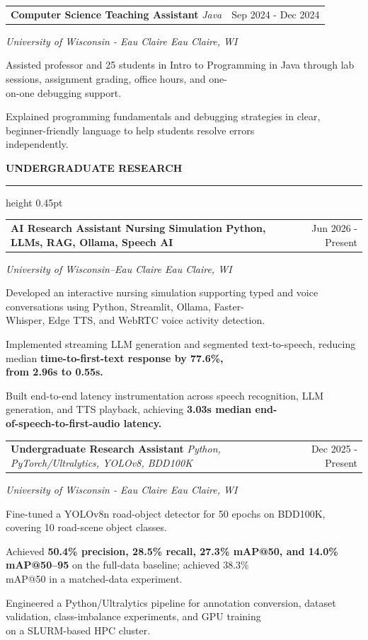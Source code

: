 \documentclass[letterpaper,10pt]{article}
\makeatletter
\newcommand{\sectionfont}{\fontsize{9.96}{10.9}\selectfont\bfseries}
\newcommand{\entryfont}{\fontsize{9.48}{10.92}\selectfont}
\newcommand{\bulletfont}{\fontsize{9.00}{10.32}\selectfont}
\newcommand{\resumesection}[1]{%
  \vspace{2.15pt}%
  {\sectionfont #1}\par
  \vspace{0.15pt}\hrule height 0.45pt\vspace{4.45pt}%
}
\newcommand{\twocolrow}[2]{%
  \noindent\begin{tabular*}{\textwidth}{@{}l@{\extracolsep{\fill}}r@{}}
    #1 & #2
  \end{tabular*}\par
}
\newcommand{\resbullet}[1]{%
  {\bulletfont\noindent\hangindent=11.52pt\hangafter=1\makebox[11.52pt][l]{\textbullet\hspace{3.4pt}}#1\par\vspace{0.95pt}}%
}
\makeatother
\begin{document}
\vspace{0.2pt}
{\entryfont
\twocolrow{\textbf{Computer Science Teaching Assistant} \textit{\textbar{} Java}}{Sep 2024 - Dec 2024}
\textit{University of Wisconsin - Eau Claire \textbar{} Eau Claire, WI}\par
}
\resbullet{Assisted professor and 25 students in Intro to Programming in Java through lab sessions, assignment grading, office hours, and one-\\
on-one debugging support.}
\resbullet{Explained programming fundamentals and debugging strategies in clear, beginner-friendly language to help students resolve errors\\
independently.}

\resumesection{UNDERGRADUATE RESEARCH}
{\entryfont
\twocolrow{\textbf{AI Research Assistant \textemdash{} Nursing Simulation \textbar{} Python, LLMs, RAG, Ollama, Speech AI}}{Jun 2026 - Present}
\textit{University of Wisconsin--Eau Claire \textbar{} Eau Claire, WI}\par
}
\resbullet{Developed an interactive nursing simulation supporting typed and voice conversations using Python, Streamlit, Ollama, Faster-\\
Whisper, Edge TTS, and WebRTC voice activity detection.}
\resbullet{Implemented streaming LLM generation and segmented text-to-speech, reducing median \textbf{time-to-first-text response by 77.6\%,}\\
\textbf{from 2.96s to 0.55s.}}
\resbullet{Built end-to-end latency instrumentation across speech recognition, LLM generation, and TTS playback, achieving \textbf{3.03s median end-}\\
\textbf{of-speech-to-first-audio latency.}}

\vspace{0.2pt}
{\entryfont
\twocolrow{\textbf{Undergraduate Research Assistant} \textit{\textbar{} Python, PyTorch/Ultralytics, YOLOv8, BDD100K}}{Dec 2025 - Present}
\textit{University of Wisconsin - Eau Claire \textbar{} Eau Claire, WI}\par
}
\resbullet{Fine-tuned a YOLOv8n road-object detector for 50 epochs on BDD100K, covering 10 road-scene object classes.}
\resbullet{Achieved \textbf{50.4\% precision, 28.5\% recall, 27.3\% mAP@50, and 14.0\% mAP@50--95} on the full-data baseline; achieved 38.3\%\\
mAP@50 in a matched-data experiment.}
\resbullet{Engineered a Python/Ultralytics pipeline for annotation conversion, dataset validation, class-imbalance experiments, and GPU training\\
on a SLURM-based HPC cluster.}
\end{document}
